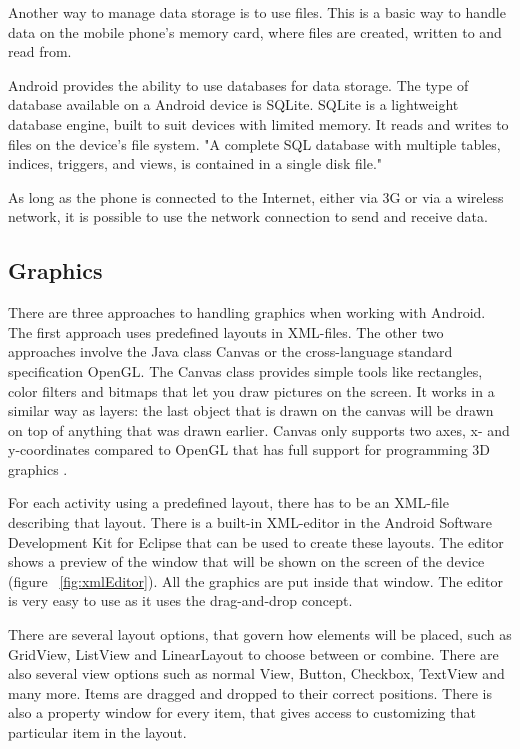 Another way to manage data storage is to use files. This is a basic way to handle data on the mobile phone's memory card, where files are created, written to and read from. \citep{Android} 

Android provides the ability to use databases for data storage. The type of database available on a Android device is SQLite. \citep{Android} SQLite is a lightweight database engine, built to suit devices with limited memory. It reads and writes to files on the device's file system. "A complete SQL database with multiple tables, indices, triggers, and views, is contained in a single disk file." \citep{SQLite}

As long as the phone is connected to the Internet, either via 3G or via a wireless network, it is possible to use the network connection to send and receive data. \citep{Android}
\subsection{Graphics}

There are three approaches to handling graphics when working with Android. The first approach uses predefined layouts in XML-files. The other two approaches involve the Java class Canvas or the cross-language standard specification OpenGL. The Canvas class provides simple tools like rectangles, color filters and bitmaps that let you draw pictures on the screen. It works in a similar way as layers: the last object that is drawn on the canvas will be drawn on top of anything that was drawn earlier. Canvas only supports two axes, x- and y-coordinates compared to OpenGL that has full support for programming 3D graphics \citep{OpenGL}.

For each activity using a predefined layout, there has to be an XML-file describing that layout. There is a built-in XML-editor in the Android Software Development Kit for Eclipse that can be used to create these layouts. The editor shows a preview of the window that will be shown on the screen of the device (figure ~\ref{fig:xmlEditor}). All the graphics are put inside that window. The editor is very easy to use as it uses the drag-and-drop concept. 

There are several layout options, that govern how elements will be placed, such as GridView, ListView and LinearLayout to choose between or combine. There are also several view options such as normal View, Button, Checkbox, TextView and many more. Items are dragged and dropped to their correct positions. There is also a property window for every item, that gives access to customizing that particular item in the layout.


